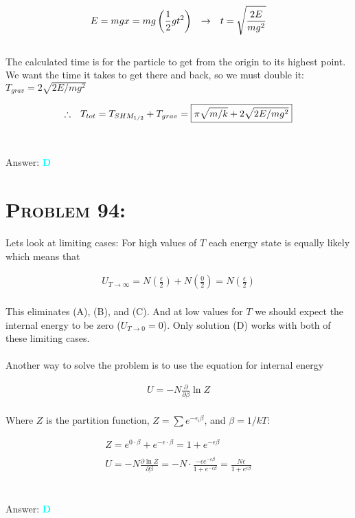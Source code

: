 \documentclass{article}
\begin{document}
\begin{gather}
E = mgx = mg \left(\frac{1}{2} g t^{2} \right) \hspace{.1in} \rightarrow \hspace{.1in} t = \sqrt{\frac{ 2E }{ mg^{2} }}\nonumber
\end{gather}
\\
The calculated time is for the particle to get from the origin to its highest point. We want the time it takes to get there and back, so we must double it: $T_{grav} = 2\sqrt{2E / mg^{2} }$

\begin{gather}
\therefore \hspace{.1in} T_{tot} = T_{SHM_{1/2}} + T_{grav} =  \boxed{\pi \sqrt{m/k} + 2\sqrt{2E / mg^{2} }}\nonumber
\end{gather}
\\\\
Answer: \textbf{\textcolor{cyan}D}\\


\section{\textsc{Problem 94:}} 
Lets look at limiting cases: For high values of $T$ each energy state is equally likely which means that 

\begin{gather}
U_{T \rightarrow \infty} = N \left(\frac{\epsilon}{2}\right) + N \left(\frac{0}{2}\right) = N \left(\frac{\epsilon}{2}\right)\nonumber
\end{gather}
\\
This eliminates (A), (B), and (C). And at low values for $T$ we should expect the internal energy to be zero ($U_{T \rightarrow 0} = 0 $). Only solution (D) works with both of these limiting cases.\\
\\
Another way to solve the problem is to use the equation for internal energy 

\begin{gather}
U = -N \frac{ \partial  }{ \partial \beta  } \ln{Z}
\end{gather}
\\
Where $Z$ is the partition function, $Z=\sum {e^{-\epsilon_{i}\beta}}$, and $\beta = 1/kT$:

\begin{gather}
Z = e^{0\cdot \beta} + e^{-\epsilon\cdot \beta}  = 1 + e^{-\epsilon\beta}\nonumber\\
\nonumber\\
U = -N \frac{\partial \ln{Z}} {\partial \beta} = -N \cdot \frac{-\epsilon e^{-\epsilon\beta}}{1 + e^{-\epsilon\beta}} = \boxed{\frac{N \epsilon }{1 + e^{\epsilon\beta}}}\nonumber
\end{gather}
\\\\
Answer: \textbf{\textcolor{cyan}D}\\
\end{document}
